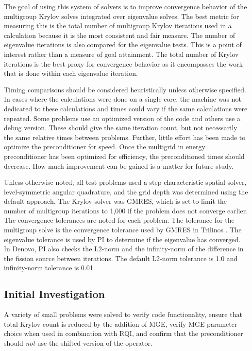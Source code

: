 \documentclass[preprint,12pt]{elsarticle}
\begin{document}
The goal of using this system of solvers is to improve convergence behavior of the multigroup Krylov solves integrated over eigenvalue solves. The best metric for measuring this is the total number of multigroup Krylov iterations used in a calculation because it is the most consistent and fair measure. The number of eigenvalue iterations is also compared for the eigenvalue tests. This is a point of interest rather than a measure of goal attainment. The total number of Krylov iterations is the best proxy for convergence behavior as it encompasses the work that is done within each eigenvalue iteration.  

Timing comparisons should be considered heuristically unless otherwise specified. In cases where the calculations were done on a single core, the machine was not dedicated to these calculations and times could vary if the same calculations were repeated. Some problems use an optimized version of the code and others use a debug version. These should give the same iteration count, but not necessarily the same relative times between problems. Further, little effort has been made to optimize the preconditioner for speed. Once the multigrid in energy preconditioner has been optimized for efficiency, the preconditioned times should decrease. How much improvement can be gained is a matter for future study. 

Unless otherwise noted, all test problems used a step characteristic spatial solver, level-symmetric angular quadrature, and the grid depth was determined using the default approach. %
The Krylov solver was GMRES, which is set to limit the number of multigroup iterations to 1,000 if the problem does not converge earlier. The convergence tolerances are noted for each problem. The tolerance for the multigroup solve is the convergence tolerance used by GMRES in Trilinos \cite{1089021}. The eigenvalue tolerance is used by PI to determine if the eigenvalue has converged. In Denovo, PI also checks the L2-norm and the infinity-norm of the difference in the fission source between iterations. The default L2-norm tolerance is 1.0 and infinity-norm tolerance is 0.01.

\subsection{Initial Investigation}
A variety of small problems were solved to verify code functionality, ensure that total Krylov count is reduced by the addition of MGE, verify MGE parameter choice when used in combination with RQI, and confirm that the preconditioner should \emph{not} use the shifted version of the operator.
\end{document}
